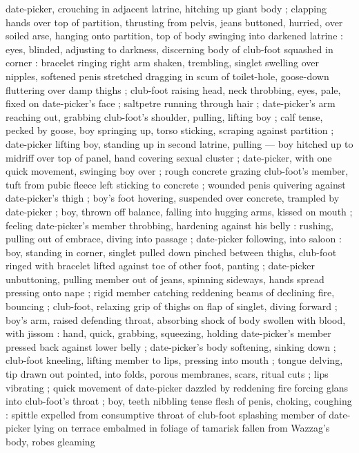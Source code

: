 date-picker, crouching in adjacent latrine, hitching up giant body ; clapping hands over top of
partition, thrusting from pelvis, jeans buttoned, hurried, over soiled arse, hanging onto partition,
top of body swinging into darkened latrine : eyes, blinded, adjusting to darkness, discerning body
of club-foot squashed in corner : bracelet ringing right arm shaken, trembling, singlet swelling
over nipples, softened penis stretched dragging in scum of toilet-hole, goose-down fluttering over
damp thighs ; club-foot raising head, neck throbbing, eyes, pale, fixed on date-picker's face ;
saltpetre running through hair ; date-picker's arm reaching out, grabbing club-foot's shoulder,
pulling, lifting boy ; calf tense, pecked by goose, boy springing up, torso sticking, scraping
against partition ; date-picker lifting boy, standing up in second latrine, pulling --- boy hitched
up to midriff over top of panel, hand covering sexual cluster ; date-picker, with one quick
movement, swinging boy over ; rough concrete grazing club-foot's member, tuft from pubic fleece left
sticking to concrete ; wounded penis quivering against date-picker's thigh ; %
boy's foot hovering, suspended over concrete, trampled by date-picker ; boy, thrown off balance,
falling into hugging arms, kissed on mouth ; feeling date-picker's member throbbing, hardening
against his belly : rushing, pulling out of embrace, diving into passage ; date-picker following,
into saloon : boy, standing in corner, singlet pulled down pinched between thighs, club-foot ringed
with bracelet lifted against toe of other foot, panting ; date-picker unbuttoning, pulling member
out of jeans, spinning sideways, hands spread pressing onto nape ; rigid member catching reddening
beams of declining fire, bouncing ; club-foot, relaxing grip of thighs on flap of singlet, diving
forward ; boy's arm, raised defending throat, absorbing shock of body swollen with blood, with
jissom : hand, quick, grabbing, squeezing, holding date-picker's member pressed back against lower
belly ; date-picker's body softening, sinking down ; club-foot kneeling, lifting member to lips,
pressing into mouth ; tongue delving, tip drawn out pointed, into folds, porous membranes, scars,
ritual cuts ; lips vibrating ; quick movement of date-picker dazzled by reddening fire forcing glans
into club-foot's throat ; boy, teeth nibbling tense flesh of penis, choking, coughing : spittle
expelled from consumptive throat of club-foot splashing member of date-picker {\semislash}
{\td}lying on terrace embalmed in foliage of tamarisk fallen from Wazzag's body, robes gleaming
